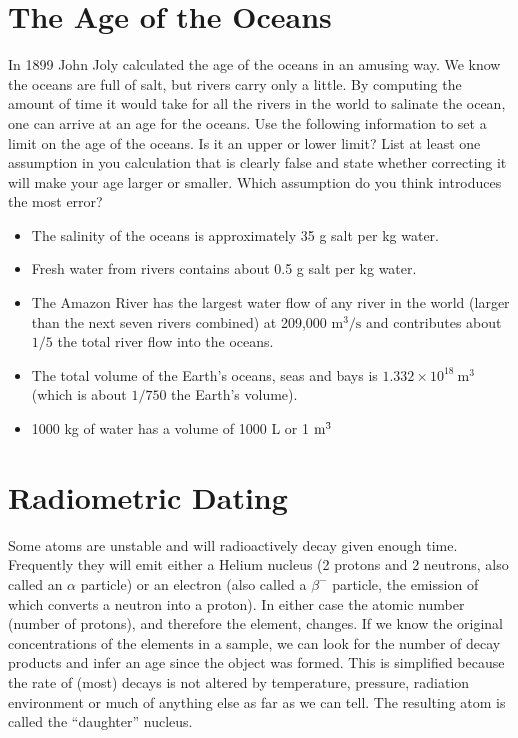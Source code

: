 \documentclass[12pt]{article}%
\begin{document}
\newpage
\section*{The Age of the Oceans}

In 1899 John Joly calculated the age of the oceans in an amusing way. 
We know the oceans are full of salt, but rivers carry only a little. 
By computing the amount of time it would take for all the rivers in the world to salinate the ocean, one can arrive at an age for the oceans. 
Use the following information to set a limit on the age of the oceans. 
Is it an upper or lower limit? 
List at least one assumption in you calculation that is clearly false and state whether correcting it will make your age larger or smaller.  Which assumption do you think introduces the most error?

\begin{itemize}
    \item The salinity of the oceans is approximately 35 g salt per kg water. 
    \item Fresh water from rivers contains about 0.5 g salt per kg water.
    \item The Amazon River has the largest water flow of any river in the world (larger than the next seven rivers combined) at 209,000 $\mathrm{m^3/s}$ and contributes about $1/5$ the total river flow into the oceans. 
    \item The total volume of the Earth's oceans, seas and bays is $1.332 \times 10^{18}~ \mathrm{m^3}$ (which is about $1/750$ the Earth's volume).
    \item 1000 kg of water has a volume of 1000 L or 1 ${\rm m^3}$
\end{itemize}


\newpage
\section*{Radiometric Dating}

Some atoms are unstable and will radioactively decay given enough time. 
Frequently they will emit either a Helium nucleus (2 protons and 2 neutrons, also called an $\alpha$ particle) or an electron (also called a $\beta^{-}$ particle, the emission of which converts a neutron into a proton). 
In either case the atomic number (number of protons), and therefore the element, changes. 
If we know the original concentrations of the elements in a sample, we can look for the number of decay products and infer an age since the object was formed. 
This is simplified because the rate of (most) decays is not altered by temperature, pressure, radiation environment or much of anything else as far as we can tell. 
The resulting atom is called the ``daughter'' nucleus.
\end{document}
